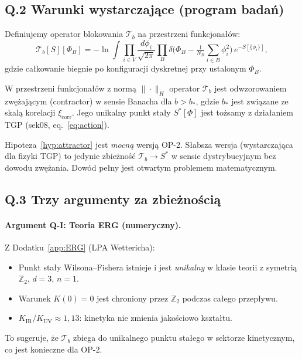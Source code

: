 \subsection*{Q.2 Warunki wystarczające (program badań)}

\begin{definicja}
Definiujemy operator blokowania $\mathcal{T}_b$ na przestrzeni funkcjonałów:
\begin{equation}
  \mathcal{T}_b[S][\Phi_B] = -\ln \int \prod_{i \in V}
    \frac{d\phi_i}{\sqrt{2\pi}}
    \prod_{B} \delta\!\bigl(\Phi_B - \tfrac{1}{N_B}{\textstyle\sum}_{i\in B}\phi_i^2\bigr)
    \, e^{-S[\{\phi_i\}]},
  \label{eq:blocking_operator}
\end{equation}
gdzie całkowanie biegnie po konfiguracji dyskretnej przy ustalonym $\Phi_B$.
\end{definicja}

\begin{hipoteza}
\label{hyp:attractor}
W przestrzeni funkcjonałów z normą $\|\cdot\|_H$ operator $\mathcal{T}_b$
jest odwzorowaniem zwężającym (contractor) w sensie Banacha dla $b > b_*$,
gdzie $b_*$ jest związane ze skalą korelacji $\xi_\mathrm{corr}$.
Jego unikalny punkt stały $S^*[\Phi]$ jest tożsamy z działaniem TGP
(sek08, eq.~\eqref{eq:action}).
\end{hipoteza}

\begin{uwaga}
Hipoteza~\ref{hyp:attractor} jest \emph{mocną} wersją OP-2.
Słabsza wersja (wystarczająca dla fizyki TGP) to jedynie zbieżność
$\mathcal{T}_b \to S^*$ w sensie dystrybucyjnym bez dowodu
zwężania. Dowód pełny jest otwartym problemem matematycznym.
\end{uwaga}

\subsection*{Q.3 Trzy argumenty za zbieżnością}

\paragraph{Argument Q-I: Teoria ERG (numeryczny).}
Z Dodatku~\ref{app:ERG} (LPA Wettericha):
\begin{itemize}
  \item Punkt stały Wilsona–Fishera istnieje i jest \emph{unikalny}
        w klasie teorii z symetrią $\mathbb{Z}_2$, $d=3$, $n=1$.
  \item Warunek $K(0) = 0$ jest chroniony przez $\mathbb{Z}_2$
        podczas całego przepływu.
  \item $K_\mathrm{IR}/K_\mathrm{UV} \approx 1{,}13$:
        kinetyka nie zmienia jakościowo kształtu.
\end{itemize}
To sugeruje, że $\mathcal{T}_b$ zbiega do unikalnego punktu stałego
w sektorze kinetycznym, co jest konieczne dla OP-2.

